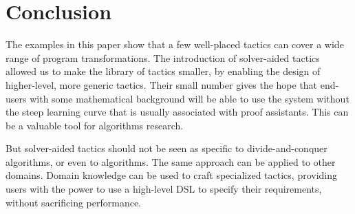 \section{Conclusion}
\label{conc}

The examples in this paper show that a few well-placed tactics can cover a wide range
of program transformations. The introduction of solver-aided tactics allowed us to make
the library of tactics smaller, by enabling the design of higher-level, more generic
tactics. Their small number gives the hope that end-users with some mathematical background
will be able to use the system without the steep learning curve that is usually associated
with proof assistants. This can be a valuable tool for algorithms research.

\begin{comment}
Moreover, limiting the number of tactics shrinks the space in which to search for programs,
so that an additional level automation may be achieved via AI or ML methods. As more
developments are done by humans and collected in a database, those algorithms would become
more adept in predicting the next step of the construction.
\end{comment}

But solver-aided tactics should not be seen as specific to divide-and-conquer algorithms,
or even to algorithms. The same approach can be applied to other domains. Domain knowledge
can be used to craft specialized tactics, providing users with the power to use a high-level
DSL to specify their requirements, without sacrificing performance.
